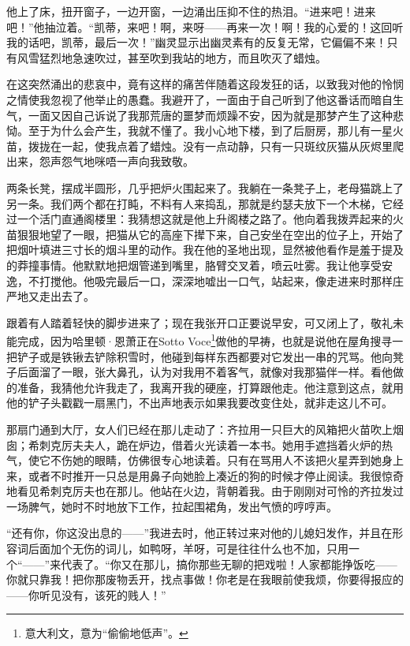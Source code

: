 \par 他上了床，扭开窗子，一边开窗，一边涌出压抑不住的热泪。“进来吧！进来吧！”他抽泣着。“凯蒂，来吧！啊，来呀——再来一次！啊！我的心爱的！这回听我的话吧，凯蒂，最后一次！”幽灵显示出幽灵素有的反复无常，它偏偏不来！只有风雪猛烈地急速吹过，甚至吹到我站的地方，而且吹灭了蜡烛。
\par 在这突然涌出的悲哀中，竟有这样的痛苦伴随着这段发狂的话，以致我对他的怜悯之情使我忽视了他举止的愚蠢。我避开了，一面由于自己听到了他这番话而暗自生气，一面又因自己诉说了我那荒唐的噩梦而烦躁不安，因为就是那梦产生了这种悲恸。至于为什么会产生，我就不懂了。我小心地下楼，到了后厨房，那儿有一星火苗，拨拢在一起，使我点着了蜡烛。没有一点动静，只有一只斑纹灰猫从灰烬里爬出来，怨声怨气地咪唔一声向我致敬。
\par 两条长凳，摆成半圆形，几乎把炉火围起来了。我躺在一条凳子上，老母猫跳上了另一条。我们两个都在打盹，不料有人来捣乱，那就是约瑟夫放下一个木梯，它经过一个活门直通阁楼里：我猜想这就是他上升阁楼之路了。他向着我拨弄起来的火苗狠狠地望了一眼，把猫从它的高座下撵下来，自己安坐在空出的位子上，开始了把烟叶填进三寸长的烟斗里的动作。我在他的圣地出现，显然被他看作是羞于提及的莽撞事情。他默默地把烟管递到嘴里，胳臂交叉着，喷云吐雾。我让他享受安逸，不打搅他。他吸完最后一口，深深地嘘出一口气，站起来，像走进来时那样庄严地又走出去了。
\par 跟着有人踏着轻快的脚步进来了；现在我张开口正要说早安，可又闭上了，敬礼未能完成，因为哈里顿·恩萧正在Sotto Voce\footnote{意大利文，意为“偷偷地低声”。}做他的早祷，也就是说他在屋角搜寻一把铲子或是铁锹去铲除积雪时，他碰到每样东西都要对它发出一串的咒骂。他向凳子后面溜了一眼，张大鼻孔，认为对我用不着客气，就像对我那猫伴一样。看他做的准备，我猜他允许我走了，我离开我的硬座，打算跟他走。他注意到这点，就用他的铲子头戳戳一扇黑门，不出声地表示如果我要改变住处，就非走这儿不可。
\par 那扇门通到大厅，女人们已经在那儿走动了：齐拉用一只巨大的风箱把火苗吹上烟囱；希刺克厉夫夫人，跪在炉边，借着火光读着一本书。她用手遮挡着火炉的热气，使它不伤她的眼睛，仿佛很专心地读着。只有在骂用人不该把火星弄到她身上来，或者不时推开一只总是用鼻子向她脸上凑近的狗的时候才停止阅读。我很惊奇地看见希刺克厉夫也在那儿。他站在火边，背朝着我。由于刚刚对可怜的齐拉发过一场脾气，她时不时地放下工作，拉起围裙角，发出气愤的哼哼声。
\par “还有你，你这没出息的——”我进去时，他正转过来对他的儿媳妇发作，并且在形容词后面加个无伤的词儿，如鸭呀，羊呀，可是往往什么也不加，只用一个“——”来代表了。“你又在那儿，搞你那些无聊的把戏啦！人家都能挣饭吃——你就只靠我！把你那废物丢开，找点事做！你老是在我眼前使我烦，你要得报应的——你听见没有，该死的贱人！”
